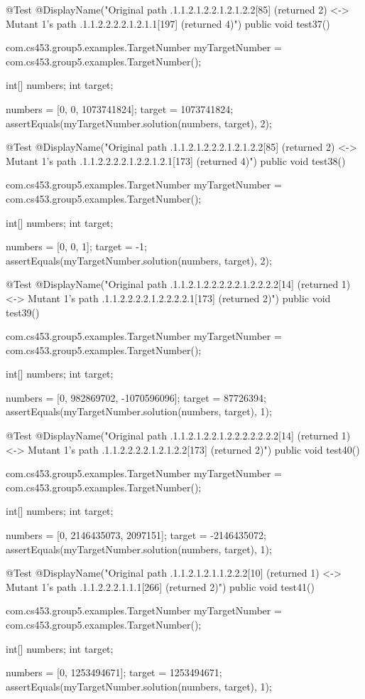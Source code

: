 @Test
@DisplayName("Original path .1.1.2.1.2.2.1.2.1.2.2[85] (returned 2) <-> Mutant 1's path .1.1.2.2.2.2.1.2.1.1[197] (returned 4)")
public void test37() {
    com.cs453.group5.examples.TargetNumber myTargetNumber = com.cs453.group5.examples.TargetNumber();

    int[] numbers;
    int target;

    numbers = [0, 0, 1073741824];
    target = 1073741824;
    assertEquals(myTargetNumber.solution(numbers, target), 2);
}

@Test
@DisplayName("Original path .1.1.2.1.2.2.2.1.2.1.2.2[85] (returned 2) <-> Mutant 1's path .1.1.2.2.2.2.1.2.2.1.2.1[173] (returned 4)")
public void test38() {
    com.cs453.group5.examples.TargetNumber myTargetNumber = com.cs453.group5.examples.TargetNumber();

    int[] numbers;
    int target;

    numbers = [0, 0, 1];
    target = -1;
    assertEquals(myTargetNumber.solution(numbers, target), 2);
}

@Test
@DisplayName("Original path .1.1.2.1.2.2.2.2.2.1.2.2.2.2[14] (returned 1) <-> Mutant 1's path .1.1.2.2.2.2.1.2.2.2.2.1[173] (returned 2)")
public void test39() {
    com.cs453.group5.examples.TargetNumber myTargetNumber = com.cs453.group5.examples.TargetNumber();

    int[] numbers;
    int target;

    numbers = [0, 982869702, -1070596096];
    target = 87726394;
    assertEquals(myTargetNumber.solution(numbers, target), 1);
}

@Test
@DisplayName("Original path .1.1.2.1.2.2.1.2.2.2.2.2.2.2[14] (returned 1) <-> Mutant 1's path .1.1.2.2.2.2.1.2.1.2.2[173] (returned 2)")
public void test40() {
    com.cs453.group5.examples.TargetNumber myTargetNumber = com.cs453.group5.examples.TargetNumber();

    int[] numbers;
    int target;

    numbers = [0, 2146435073, 2097151];
    target = -2146435072;
    assertEquals(myTargetNumber.solution(numbers, target), 1);
}

@Test
@DisplayName("Original path .1.1.2.1.2.1.1.2.2.2[10] (returned 1) <-> Mutant 1's path .1.1.2.2.2.1.1.1[266] (returned 2)")
public void test41() {
    com.cs453.group5.examples.TargetNumber myTargetNumber = com.cs453.group5.examples.TargetNumber();

    int[] numbers;
    int target;

    numbers = [0, 1253494671];
    target = 1253494671;
    assertEquals(myTargetNumber.solution(numbers, target), 1);
}

